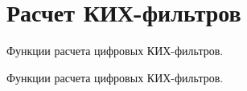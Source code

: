 \hypertarget{group___f_i_r___f_i_l_t_e_r___d_e_s_i_g_n___g_r_o_u_p}{}\section{Расчет КИХ-\/фильтров}
\label{group___f_i_r___f_i_l_t_e_r___d_e_s_i_g_n___g_r_o_u_p}


Функции расчета цифровых КИХ-\/фильтров.  


Функции расчета цифровых КИХ-\/фильтров. 

